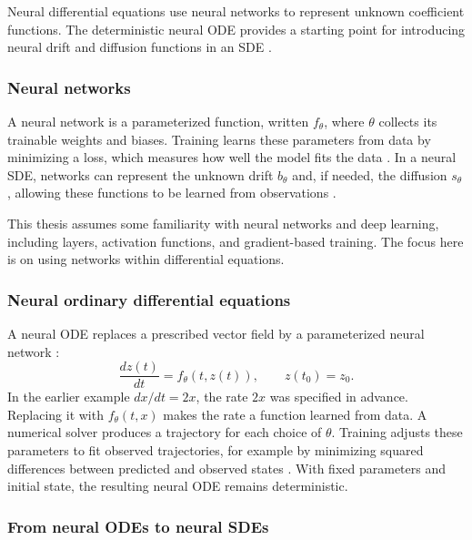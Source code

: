 Neural differential equations use neural networks to represent unknown
coefficient functions. The deterministic neural ODE provides a starting point
for introducing neural drift and diffusion functions in an SDE
\parencite{Kidger2022}.

\subsubsection{Neural networks}
\label{sec:neural-network-background}

A neural network is a parameterized function, written $f_\theta$, where
$\theta$ collects its trainable weights and biases. Training learns these
parameters from data by minimizing a loss, which measures how well the model
fits the data \parencite{Goodfellow2016}. In a neural SDE, networks can
represent the unknown drift
$b_\theta$ and, if needed, the diffusion $s_\theta$, allowing these functions
to be learned from observations \parencite{Kidger2022}.

This thesis assumes some familiarity with neural networks and deep learning,
including layers, activation functions, and gradient-based training. The focus
here is on using networks within differential equations.

\subsubsection{Neural ordinary differential equations}
\label{sec:neural-ode-theory}

A neural ODE replaces a prescribed vector field by a parameterized neural
network \parencite{Chen2018}:
\begin{equation}
    \frac{dz(t)}{dt}=f_\theta(t,z(t)),\qquad z(t_0)=z_0.
    \label{eq:neural-ode}
\end{equation}
In the earlier example $dx/dt=2x$, the rate $2x$ was specified in advance.
Replacing it with $f_\theta(t,x)$ makes the rate a function learned from data.
A numerical solver produces a trajectory for each choice of $\theta$.
Training adjusts these parameters to fit observed trajectories, for example
by minimizing squared differences between predicted and observed states
\parencite{Chen2018}. With fixed parameters and initial state, the resulting
neural ODE remains deterministic.

\subsubsection{From neural ODEs to neural SDEs}

